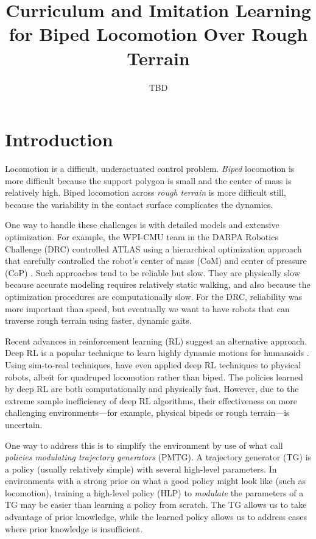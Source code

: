\documentclass[a4paper]{article}
\title{Curriculum and Imitation Learning for Biped Locomotion Over Rough Terrain}
\author{TBD}
\begin{document}
\maketitle

\section{Introduction}

Locomotion is a difficult, underactuated control problem.
\emph{Biped} locomotion is more difficult because the support polygon is small and the center of mass is relatively high.
Biped locomotion across \emph{rough terrain} is more difficult still, because the variability in the contact surface complicates the dynamics.

One way to handle these challenges is with detailed models and extensive optimization.
For example, the WPI-CMU team in the DARPA Robotics Challenge (DRC) controlled ATLAS using a hierarchical optimization approach that carefully controlled the robot's center of mass (CoM) and center of pressure (CoP) \citep{feng2015optimization}.
Such approaches tend to be reliable but slow.
They are physically slow because accurate modeling requires relatively static walking, and also because the optimization procedures are computationally slow.
For the DRC, reliability was more important than speed, but eventually we want to have robots that can traverse rough terrain using faster, dynamic gaits.

Recent advances in reinforcement learning (RL) suggest an alternative approach.
Deep RL is a popular technique to learn highly dynamic motions for humanoids \citep{peng2018deepmimic, heess2017emergence}.
Using sim-to-real techniques, \citet{tan2018sim} have even applied deep RL techniques to physical robots, albeit for quadruped locomotion rather than biped.
The policies learned by deep RL are both computationally and physically fast.
However, due to the extreme sample inefficiency of deep RL algorithms, their effectiveness on more challenging environments---for example, physical bipeds or rough terrain---is uncertain.

One way to address this is to simplify the environment by use of what \citet{iscen2018pmtg} call \emph{policies modulating trajectory generators} (PMTG).
A trajectory generator (TG) is a policy (usually relatively simple) with several high-level parameters.
In environments with a strong prior on what a good policy might look like (such as locomotion),
training a high-level policy (HLP) to \emph{modulate} the parameters of a TG may be easier than learning a policy from scratch.
The TG allows us to take advantage of prior knowledge, while the learned policy allows us to address cases where prior knowledge is insufficient.
\end{document}
